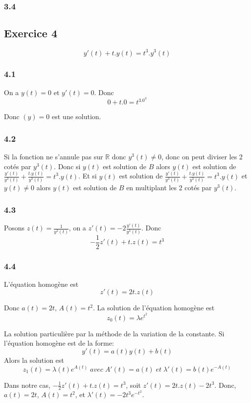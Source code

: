 \documentclass[]{book}
\theoremstyle{definition}
\newcommand{\bb}[1]{\mathbb{#1}}
\newcommand{\R}{\bb{R}}
\begin{document}
\subsubsection*{3.4}


\subsection*{Exercice 4}
$$y'(t) + t.y(t) = t^3.y^3(t)$$
\subsubsection*{4.1}
On a $y(t) = 0$ et $y'(t) = 0$.
Donc
$$0 + t.0 = t^3.0^3$$

Donc $(y) = 0$ est une solution.

\subsubsection*{4.2}
Si la fonction ne s'annule pas sur $\R$ donc $y^3(t) \neq 0$, donc on peut diviser les 2 cot\'es par $y^3(t)$. Donc si $y(t)$ est solution de $B$ alors $y(t)$ est solution de $\frac{y'(t)}{y^3(t)} + \frac{t.y(t)}{y^3(t)} = t^3.y(t)$. Et si $y(t)$ est solution de $\frac{y'(t)}{y^3(t)} + \frac{t.y(t)}{y^3(t)} = t^3.y(t)$ et $y(t) \neq 0$ alors $y(t)$ est solution de $B$ en multiplant les 2 cot\'es par $y^3(t)$.


\subsubsection*{4.3}
Posons $z(t) = \frac{1}{y^2(t)}$, on a $z'(t) = -2\frac{y'(t)}{y^3(t)}$. Donc
$$-\frac{1}{2}z'(t) + t.z(t) = t^3$$

\subsubsection*{4.4}
L'\'equation homog\`ene est
$$z'(t) = 2t.z(t) $$

Donc $a(t) = 2t$, $A(t) = t^2$. La solution de l'\'equation homog\`ene est
$$z_0(t) = \lambda e^{t^2}$$

La solution particuli\`ere par la m\'ethode de la variation de la constante.
Si l'\'equation homog\`ene est de la forme:
$$y'(t) = a(t)y(t) + b(t)$$
Alors la solution est
$$z_1(t) = \lambda(t) e^{A(t)}\; avec\; A'(t) = a(t)\; et\; \lambda'(t) = b(t)e^{-A(t)}$$


Dans notre cas, $-\frac{1}{2}z'(t) + t.z(t) = t^3$, soit $z'(t) = 2t.z(t) - 2t^3$. Donc, $a(t) = 2t$, $A(t)=t^2$, et $\lambda'(t) = -2t^3e^{-t^2}$.
\end{document}
